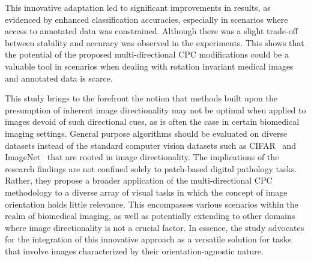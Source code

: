 This innovative adaptation led to significant improvements in results, as evidenced by enhanced classification accuracies, especially in scenarios where access to annotated data was constrained. Although there was a slight trade-off between stability and accuracy was observed in the experiments. This shows that the potential of the proposed multi-directional CPC modifications could be a valuable tool in scenarios when dealing with rotation invariant medical images and annotated data is scarce. 

This study brings to the forefront the notion that methods built upon the presumption of inherent image directionality may not be optimal when applied to images devoid of such directional cues, as is often the case in certain biomedical imaging settings. General purpose algorithms should be evaluated on diverse datasets instead of the standard computer vision datasets such as CIFAR~\citep{krizhevsky2009learning} and ImageNet~\citep{deng2009imagenet} that are rooted in image directionality. The implications of the research findings are not confined solely to patch-based digital pathology tasks. Rather, they propose a broader application of the multi-directional CPC methodology to a diverse array of visual tasks in which the concept of image orientation holds little relevance. This encompasses various scenarios within the realm of biomedical imaging, as well as potentially extending to other domains where image directionality is not a crucial factor. In essence, the study advocates for the integration of this innovative approach as a versatile solution for tasks that involve images characterized by their orientation-agnostic nature.